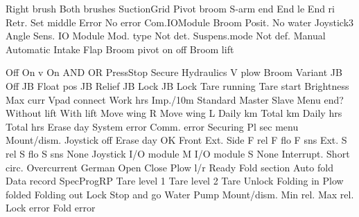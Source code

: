  {Right brush}
 {Both brushes}
 {SuctionGrid}
 {Pivot broom}
 {S-arm end}
 {End le}
 {End ri}
 {Retr.}
 {Set middle}
 {Error}
 {No error}
 {Com.IOModule}
 {Broom Posit.}
 {No water}
 {Joystick3}
 {Angle Sens.}
 {IO Module}
 {Mod. type}
 {Not det.}
 {Suspens.mode}
 {Not def.}
 {Manual}
 {Automatic}
 {Intake Flap}
 {Broom pivot}
 {on}
 {off}
 {Broom lift}

 {Off}
 {On}
 {v On}
 {AND}
 {OR}
 {PressStop}
 {Secure}
 {Hydraulics}
 {V plow}
 {Broom}
 {Variant}
 {JB Off}
 {JB Float pos}
 {JB Relief}
 {JB Lock}
 {JB Lock}
 {Tare running}
 {Tare start}
 {Brightness}
 {Max curr}
 {Vpad connect}
 {Work hrs}
 {Imp./10m}
 {Standard}
 {Master}
 {Slave}
 {Menu end?}
 {Without lift}
 {With lift}
 {Move wing R}
 {Move wing L}
 {Daily km}
 {Total km}
 {Daily hrs}
 {Total hrs}
 {Erase day}
 {System error}
 {Comm. error}
 {Securing}
 {Pl sec menu}
 {Mount/dism.}
 {Joystick off}
 {Erase day OK}
 {Front}
 {Ext.}
 {Side}
 {F rel}
 {F flo}
 {F sns}
 {Ext.}
 {S rel}
 {S flo}
 {S sns}
 {None}
 {Joystick}
 {I/O module M}
 {I/O module S}
 {None}
 {Interrupt.}
 {Short circ.}
 {Overcurrent}
 {German}
 {Open Close}
 {Plow l/r}
 {Ready}
 {Fold section}
 {Auto fold}
 {Data record}
 {SpecProgRP}
 {Tare level 1}
 {Tare level 2}
 {Tare}
 {Unlock}
 {Folding in}
 {Plow folded}
 {Folding out}
 {Lock}
 {Stop and go}
 {Water}
 {Pump}
 {Mount/dism.}
 {Min rel.}
 {Max rel.}
 {Lock error}
 {Fold error}

